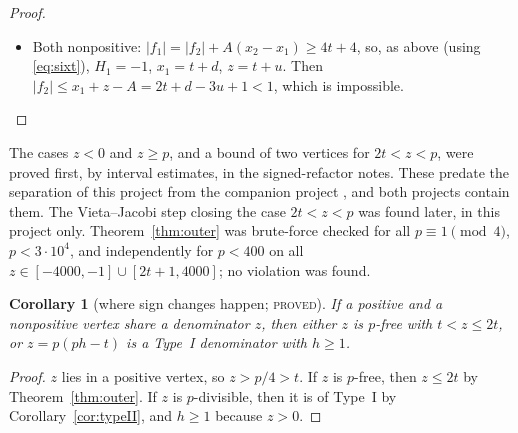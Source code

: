 \documentclass[11pt,reqno]{amsart}
\newtheorem{corollary}[theorem]{Corollary}
\theoremstyle{definition}
\newcommand{\status}[1]{\textsc{#1}}
\begin{document}
\begin{proof}
\begin{itemize}
Then $d=\lambda\alpha^2$, $u=\lambda\beta^2$ and $t=\lambda\alpha\beta$ with
$\alpha<\beta$; put $\gamma=\beta-\alpha$.  A computation from
\eqref{eq:vieta} gives
\begin{gather*}
 f_P=f_N+A=\lambda\gamma(4\beta-\gamma)-1,\\
 x_P+z=w+1,\qquad z^2=\lambda\beta^2w,\qquad w:=\lambda(\alpha+\beta)^2 .
\end{gather*}
Positivity needs $f_P\mid z^2$ and $f_P\mid x_P+z=w+1$.  So
$\gcd(f_P,w)=1$, and then $f_P\mid\lambda\beta^2$.  As
$f_P\equiv-1\pmod\lambda$, in fact $f_P\mid\beta^2$, say $\beta^2=kf_P$
with $k\ge1$.  Then $\beta$ is a root of
$X^2-4k\lambda\gamma X+k(\lambda\gamma^2+1)$.  So the quarter-discriminant
$k(\lambda\gamma^2\mathcal M-1)$, with $\mathcal M=4k\lambda-1\ge3$, is a
square $s^2$, and $s^2\equiv-k\pmod{\mathcal M}$ with
$\gcd(k,\mathcal M)=1$.  But $(-1|\mathcal M)=-1$.  If $2\mid k$ then
$\mathcal M\equiv7\pmod8$, so $(2|\mathcal M)=1$.  For the odd part $k'$
of $k$, reciprocity and $\mathcal M\equiv-1\pmod{k'}$ give
$(k'|\mathcal M)=(-1|k')(-1)^{(k'-1)/2}=1$.  So the Jacobi symbol
$(-k|\mathcal M)=-1$, and $-k$ is not a square modulo $\mathcal M$; this
is a contradiction.
\item Both nonpositive: $|f_1|=|f_2|+A(x_2-x_1)\ge4t+4$, so, as above (using
\eqref{eq:sixt}), $H_1=-1$, $x_1=t+d$, $z=t+u$.  Then
$|f_2|\le x_1+z-A=2t+d-3u+1<1$, which is impossible.\qedhere
\end{itemize}
\end{proof}

The cases $z<0$ and $z\ge p$, and a bound of two vertices for $2t<z<p$,
were proved first, by interval estimates, in the signed-refactor notes.
These predate the separation of this project from the companion project
\cite{AS}, and both projects contain them.  The Vieta--Jacobi step closing
the case $2t<z<p$ was found later, in this project only.  Theorem~\ref{thm:outer} was brute-force checked for all
$p\equiv1\pmod4$, $p<3\cdot10^4$, and independently for $p<400$ on all
$z\in[-4000,-1]\cup[2t+1,4000]$; no violation was found.

\begin{corollary}[where sign changes happen; \status{proved}]\label{cor:crossing}
If a positive and a nonpositive vertex share a denominator $z$, then either
$z$ is $p$-free with $t<z\le2t$, or $z=p(ph-t)$ is a Type~I denominator
with $h\ge1$.
\end{corollary}

\begin{proof}
$z$ lies in a positive vertex, so $z>p/4>t$.  If $z$ is $p$-free, then
$z\le2t$ by Theorem~\ref{thm:outer}.  If $z$ is $p$-divisible, then it is
of Type~I by Corollary~\ref{cor:typeII}, and $h\ge1$ because $z>0$.
\end{proof}
\end{document}
